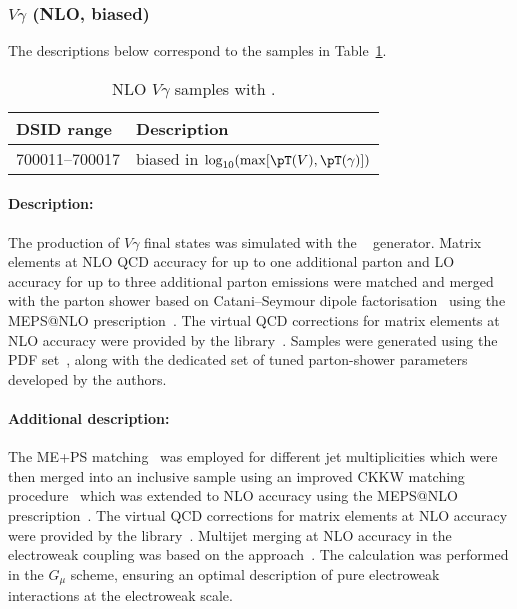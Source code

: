 


\subsubsection[Vgamma (NLO, biased)]{$V\gamma$ (NLO, biased)}

The descriptions below correspond to the samples in
Table~\ref{tab:MB-sherpa-vynlo-ew}.

\begin{table}[htbp]
  \caption{NLO $V\gamma$ samples with \SHERPA.}%
  \label{tab:MB-sherpa-vynlo-ew}
  \centering
  \begin{tabular}{l l}
    \toprule
    DSID range & Description \\
    \midrule
    700011--700017 & biased in $\log_{10}(\max[\pT(V), \pT(\gamma)])$\\
    \bottomrule
  \end{tabular}
\end{table}

\paragraph{Description:}

The production of $V\gamma$ final states was simulated with the
\SHERPA[2.2.8]~\cite{Bothmann:2019yzt} generator.  Matrix elements at
NLO QCD accuracy for up to one additional parton and LO accuracy for
up to three additional parton emissions were matched and merged with
the \SHERPA parton shower based on Catani--Seymour
dipole factorisation~\cite{Gleisberg:2008fv,Schumann:2007mg} using the MEPS@NLO
prescription~\cite{Hoeche:2011fd,Hoeche:2012yf,Catani:2001cc,Hoeche:2009rj}.
The virtual QCD corrections for matrix elements at NLO accuracy were provided by 
the \OPENLOOPS[2] library~\cite{Buccioni:2019sur,Cascioli:2011va,Buccioni:2017yxi,Denner:2016kdg}.
Samples were generated using the \NNPDF[3.0nnlo] PDF set~\cite{Ball:2014uwa}, along with
the dedicated set of tuned parton-shower parameters developed by the \SHERPA authors.


\paragraph{Additional description:}

The ME+PS matching~\cite{Hoeche:2011fd} was employed for different jet
multiplicities which were then merged into an inclusive sample 
using an improved CKKW matching
procedure~\cite{Catani:2001cc,Hoeche:2009rj} which was extended to NLO
accuracy using the MEPS@NLO prescription~\cite{Hoeche:2012yf}. 
The virtual QCD corrections for matrix elements at NLO accuracy were provided by 
the \OPENLOOPS[2] library~\cite{Buccioni:2019sur,Cascioli:2011va,Buccioni:2017yxi,Denner:2016kdg}.
Multijet merging at NLO accuracy in the electroweak coupling was based on 
the \NLOEWvirt approach~\cite{Kallweit:2014xda,Kallweit:2015dum}.
The calculation was performed in the $G_\mu$ scheme, ensuring an optimal 
description of pure electroweak interactions at the electroweak scale.

